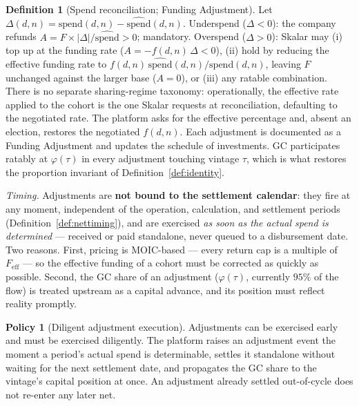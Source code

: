 \documentclass[11pt, a4paper]{article}
\theoremstyle{definition}
\newtheorem{definition}{Definition}[section]
\newtheorem{policy}{Policy}
\newcommand{\src}[1]{}
\newcommand{\GCCIA}{upstream facility}
\newcommand{\KCIA}{downstream agreement}
\newcommand{\spend}{\mathrm{spend}}               %
\newcommand{\espend}{\widehat{\mathrm{spend}}}    %
\begin{document}
\begin{definition}[Spend reconciliation; Funding Adjustment]\label{def:fa}
Let $\Delta(d,n) = \spend(d,n) - \espend(d,n)$. Underspend ($\Delta < 0$): the company refunds $A = F \times |\Delta| / \espend > 0$; mandatory. Overspend ($\Delta > 0$): Skalar may (i) top up at the funding rate ($A = -f(d,n)\,\Delta < 0$), (ii) hold by reducing the effective funding rate to $f(d,n)\,\espend(d,n)/\spend(d,n)$, leaving $F$ unchanged against the larger base ($A = 0$), or (iii) any ratable combination. There is no separate sharing-regime taxonomy: operationally, the effective rate applied to the cohort is the one Skalar requests at reconciliation, defaulting to the negotiated rate. The platform asks for the effective percentage and, absent an election, restores the negotiated $f(d,n)$. Each adjustment is documented as a Funding Adjustment and updates the schedule of investments. GC participates ratably at $\varphi(\tau)$ in every adjustment touching vintage $\tau$, which is what restores the proportion invariant of Definition~\ref{def:identity}.

\emph{Timing.} Adjustments are \textbf{not bound to the settlement calendar}: they fire at any moment, independent of the operation, calculation, and settlement periods (Definition~\ref{def:nettiming}), and are exercised \emph{as soon as the actual spend is determined} --- received or paid standalone, never queued to a disbursement date. Two reasons. First, pricing is MOIC-based --- every return cap is a multiple of $F_{\mathrm{eff}}$ --- so the effective funding of a cohort must be corrected as quickly as possible. Second, the GC share of an adjustment ($\varphi(\tau)$, currently $95\%$ of the flow) is treated upstream as a capital advance, and its position must reflect reality promptly.
\end{definition}

\begin{policy}[Diligent adjustment execution]\label{pol:adjust}
Adjustments can be exercised early and must be exercised diligently. The platform raises an adjustment event the moment a period's actual spend is determinable, settles it standalone without waiting for the next settlement date, and propagates the GC share to the vintage's capital position at once. An adjustment already settled out-of-cycle does not re-enter any later net.
\src{\KCIA{} \S2.1(d), Exh.~B; \GCCIA{} \S2.1(d), Exh.~B.}
\end{policy}
\end{document}
